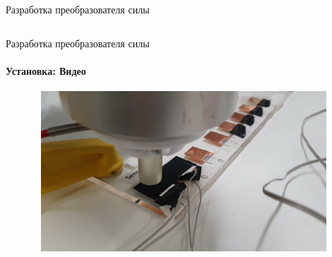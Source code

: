 \documentclass[aspectratio=169,xcolor=table]{beamer}
\begin{document}
\begin{frame}[t]{Разработка преобразователя силы}
\begin{columns}[T,onlytextwidth]
\begin{column}{0.39\textwidth}
        \end{column}
    \end{columns}
\end{frame}

\begin{frame}[t]{Разработка преобразователя силы}
    \framesubtitle{Установка: Видео}
    \vspace{-15pt}
    \begin{figure}[H]
        \href{https://youtu.be/Gw4wVZ-ESuE}{
            \centering\includegraphics[height=6cm,width=1\textwidth,keepaspectratio]{exp_stand_video_preview.jpg}}
    \end{figure}
\end{frame}
\end{document}
